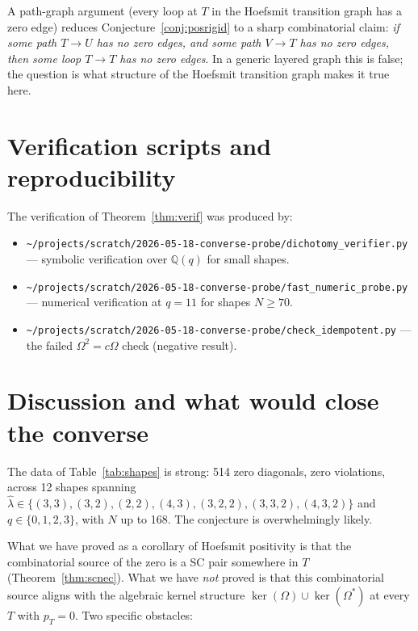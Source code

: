 \documentclass[11pt]{article}
\theoremstyle{definition}
\newcommand{\Om}{\Omega}
\newcommand{\Omstar}{\Omega^{\ast}}
\newcommand{\hatl}{\widehat\lambda}
\newcommand{\pT}{p_T}
\begin{document}
A path-graph argument (every loop at $T$ in the Hoefsmit transition
graph has a zero edge) reduces Conjecture~\ref{conj:posrigid} to a
sharp combinatorial claim: \emph{if some path $T \to U$ has no zero
edges, and some path $V \to T$ has no zero edges, then some loop
$T \to T$ has no zero edges}. In a generic layered graph this is
false; the question is what structure of the Hoefsmit transition
graph makes it true here.

\section{Verification scripts and reproducibility}

The verification of Theorem~\ref{thm:verif} was produced by:

\begin{itemize}[topsep=0.2em,itemsep=0.1em]
\item \texttt{\textasciitilde/projects/scratch/2026-05-18-converse-probe/dichotomy\_verifier.py}
  --- symbolic verification over $\mathbb{Q}(q)$ for small shapes.
\item \texttt{\textasciitilde/projects/scratch/2026-05-18-converse-probe/fast\_numeric\_probe.py}
  --- numerical verification at $q = 11$ for shapes $N \ge 70$.
\item \texttt{\textasciitilde/projects/scratch/2026-05-18-converse-probe/check\_idempotent.py}
  --- the failed $\Om^2 = c \Om$ check (negative result).
\end{itemize}

\section{Discussion and what would close the converse}

The data of Table~\ref{tab:shapes} is strong: 514 zero diagonals,
zero violations, across 12 shapes spanning $\hatl \in
\{(3,3), (3,2), (2,2), (4,3), (3,2,2), (3,3,2), (4,3,2)\}$ and
$q \in \{0, 1, 2, 3\}$, with $N$ up to 168. The conjecture is
overwhelmingly likely.

What we have proved as a corollary of Hoefsmit positivity is that the
combinatorial source of the zero is a SC pair somewhere in $T$
(Theorem~\ref{thm:scnec}). What we have \emph{not} proved is that this
combinatorial source aligns with the algebraic kernel structure
$\ker(\Om) \cup \ker(\Omstar)$ at every $T$ with $\pT = 0$. Two
specific obstacles:
\end{document}
